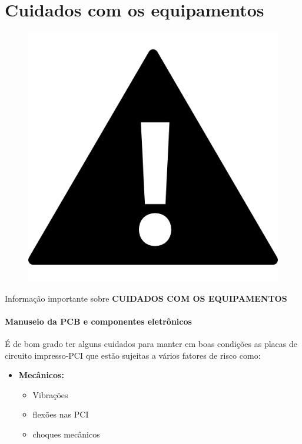 \chapter{Cuidados com os equipamentos}

\begin{center}
    \begin{figure}[H]
    \centering
		\includegraphics[scale=1.6]{Figuras/bateria/iconeimportante.png}
	    \label{iconeimportante}
    \end{figure} 
  
    	Informação importante sobre \textbf{CUIDADOS COM OS EQUIPAMENTOS}
 \end{center} 

\subsubsection*{Manuseio da PCB e componentes eletrônicos}

\PAR É de bom grado ter alguns cuidados para manter em boas condições as placas de circuito impresso-PCI que estão sujeitas a vários fatores de risco como:
\begin{itemize}
\item \textbf{Mecânicos:}
\begin{itemize}
\item Vibrações
\item flexões nas PCI 
\item choques mecânicos
\end{itemize}
\end{itemize}

